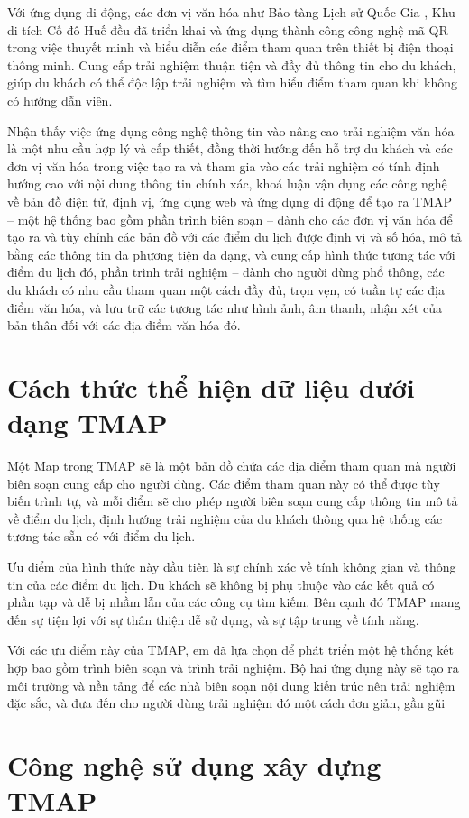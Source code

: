 Với ứng dụng di động, các đơn vị văn hóa như Bảo tàng Lịch sử Quốc Gia
\cite{vtv2022}, Khu di tích Cố đô Huế \cite{hue2022} đều đã triển khai và ứng dụng thành công công nghệ
mã QR trong việc thuyết minh và biểu diễn các điểm tham quan trên thiết bị điện
thoại thông minh. Cung cấp trải nghiệm thuận tiện và đầy đủ thông tin cho du khách,
giúp du khách có thể độc lập trải nghiệm và tìm hiểu điểm tham quan khi không có
hướng dẫn viên.

Nhận thấy việc ứng dụng công nghệ thông tin vào nâng cao trải nghiệm văn
hóa là một nhu cầu hợp lý và cấp thiết, đồng thời hướng đến hỗ trợ du khách và các
đơn vị văn hóa trong việc tạo ra và tham gia vào các trải nghiệm có tính định hướng
cao với nội dung thông tin chính xác, khoá luận vận dụng các công nghệ về bản đồ điện
tử, định vị, ứng dụng web và ứng dụng di động để tạo ra TMAP – một hệ thống bao
gồm phần trình biên soạn – dành cho các đơn vị văn hóa để tạo ra và tùy chỉnh các
bản đồ với các điểm du lịch được định vị và số hóa, mô tả bằng các thông tin đa
phương tiện đa dạng, và cung cấp hình thức tương tác với điểm du lịch đó, phần trình
trải nghiệm – dành cho người dùng phổ thông, các du khách có nhu cầu tham quan
một cách đầy đủ, trọn vẹn, có tuần tự các địa điểm văn hóa, và lưu trữ các tương tác
như hình ảnh, âm thanh, nhận xét của bản thân đối với các địa điểm văn hóa đó.

\section{Cách thức thể hiện dữ liệu dưới dạng TMAP}
Một Map trong TMAP sẽ là một bản đồ chứa các địa điểm tham quan mà
người biên soạn cung cấp cho người dùng. Các điểm tham quan này có thể được tùy
biến trình tự, và mỗi điểm sẽ cho phép người biên soạn cung cấp thông tin mô tả về
điểm du lịch, định hướng trải nghiệm của du khách thông qua hệ thống các tương tác
sẵn có với điểm du lịch.

Ưu điểm của hình thức này đầu tiên là sự chính xác về tính không gian và
thông tin của các điểm du lịch. Du khách sẽ không bị phụ thuộc vào các kết quả có
phần tạp và dễ bị nhầm lẫn của các công cụ tìm kiếm. Bên cạnh đó TMAP mang đến
sự tiện lợi với sự thân thiện dễ sử dụng, và sự tập trung về tính năng.

Với các ưu điểm này của TMAP, em đã lựa chọn để phát triển một hệ thống
kết hợp bao gồm trình biên soạn và trình trải nghiệm. Bộ hai ứng dụng này sẽ tạo ra
môi trường và nền tảng để các nhà biên soạn nội dung kiến trúc nên trải nghiệm đặc
sắc, và đưa đến cho người dùng trải nghiệm đó một cách đơn giản, gần gũi

\section{Công nghệ sử dụng xây dựng TMAP}
